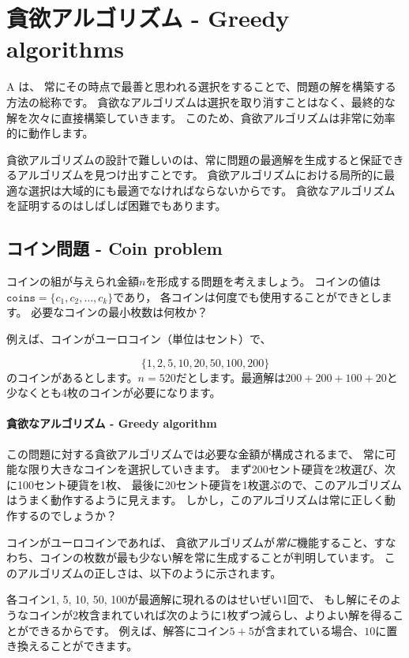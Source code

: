 \chapter{貪欲アルゴリズム - Greedy algorithms}


A は、
常にその時点で最善と思われる選択をすることで、問題の解を構築する方法の総称です。
貪欲なアルゴリズムは選択を取り消すことはなく、最終的な解を次々に直接構築していきます。
このため、貪欲アルゴリズムは非常に効率的に動作します。

貪欲アルゴリズムの設計で難しいのは、常に問題の最適解を生成すると保証できるアルゴリズムを見つけ出すことです。
貪欲アルゴリズムにおける局所的に最適な選択は大域的にも最適でなければならないからです。
貪欲なアルゴリズムを証明するのはしばしば困難でもあります。

\section{コイン問題 - Coin problem}

コインの組が与えられ金額$n$を形成する問題を考えましょう。
コインの値は$\texttt{coins}=\{c_1,c_2,\ldots,c_k\}$であり，
各コインは何度でも使用することができとします。
必要なコインの最小枚数は何枚か？

例えば、コインがユーロコイン（単位はセント）で、

\[\{1,2,5,10,20,50,100,200\}\]
のコインがあるとします。$n=520$だとします。最適解は$200+200+100+20$と少なくとも4枚のコインが必要になります。

\subsubsection{貪欲なアルゴリズム - Greedy algorithm}

この問題に対する貪欲アルゴリズムでは必要な金額が構成されるまで、
常に可能な限り大きなコインを選択していきます。
まず200セント硬貨を2枚選び、次に100セント硬貨を1枚、
最後に20セント硬貨を1枚選ぶので、このアルゴリズムはうまく動作するように見えます。
しかし，このアルゴリズムは常に正しく動作するのでしょうか？

コインがユーロコインであれば、
貪欲アルゴリズムが\emph{常に}機能すること、すなわち、コインの枚数が最も少ない解を常に生成することが判明しています。
このアルゴリズムの正しさは、以下のように示されます。

各コイン1, 5, 10, 50, 100が最適解に現れるのはせいぜい1回で、
もし解にそのようなコインが2枚含まれていれば次のように1枚ずつ減らし、よりよい解を得ることができるからです。
例えば、解答にコイン$5+5$が含まれている場合、$10$に置き換えることができます。

